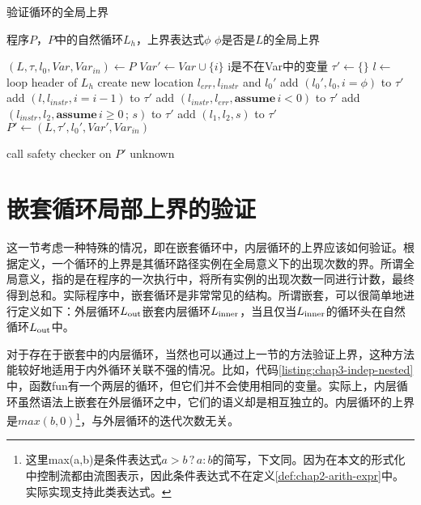 \renewcommand{\algorithmicrequire}{\textbf{输入：}\unskip}
\renewcommand{\algorithmicensure}{\textbf{输出：}\unskip}
\renewcommand{\algorithmiccomment}[1]{\hfill// #1}
\begin{algorithm}
  \caption{验证循环的全局上界}
  \label{alg:global-verif}
  \begin{algorithmic}
    \REQUIRE 程序$P$，$P$中的自然循环$L_h$，上界表达式$\phi$
    \ENSURE $\phi$是否是$L$的全局上界

    \STATE $(L, \tau, l_0, Var, Var_{in}) \leftarrow P$
    \STATE $Var' \leftarrow Var \cup \{i\}$ \COMMENT i是不在Var中的变量
    \STATE $\tau' \leftarrow \{\}$
    \STATE $l \leftarrow$ loop header of $L_h$
    \STATE create new location $l_{err}, l_{instr}$ and $l_0'$
    \STATE add $(l_0', l_0, i = \phi)$ to $\tau'$
    \STATE add $(l, l_{instr}, i = i - 1)$ to $\tau'$
    \STATE add $(l_{instr}, l_{err}, \mathbf{assume}\, i < 0)$ to $\tau'$
        \STATE add $(l_{instr}, l_2, \mathbf{assume}\, i \geq 0\, \mathbf{;}\, s)$ to $\tau'$
    \ENDFOR
        \STATE add $(l_1, l_2, s)$ to $\tau'$ 
    \ENDFOR
    \STATE $P' \leftarrow (L, \tau', l_0', Var', Var_{in})$
    
    \STATE call safety checker on $P'$ 
        \RETURN \TRUE
        \RETURN \FALSE
        \RETURN unknown
    \ENDIF

  \end{algorithmic}
\end{algorithm}

\section{嵌套循环局部上界的验证}

这一节考虑一种特殊的情况，即在嵌套循环中，内层循环的上界应该如何验证。根据定义，一个循环的上界是其循环路径实例在全局意义下的出现次数的界。所谓全局意义，指的是在程序的一次执行中，将所有实例的出现次数一同进行计数，最终得到总和。实际程序中，嵌套循环是非常常见的结构。所谓嵌套，可以很简单地进行定义如下：外层循环$L_{\operatorname{out}}$嵌套内层循环$L_{\operatorname{inner}}$，当且仅当$L_{\operatorname{inner}}$的循环头在自然循环$L_{\operatorname{out}}$中。

对于存在于嵌套中的内层循环，当然也可以通过上一节的方法验证上界，这种方法能较好地适用于内外循环关联不强的情况。比如，代码\ref{listing:chap3-indep-nested}中，函数fun有一个两层的循环，但它们并不会使用相同的变量。实际上，内层循环虽然语法上嵌套在外层循环之中，它们的语义却是相互独立的。内层循环的上界是$max(b, 0)$\footnote{这里max(a,b)是条件表达式$a>b\,?\,a:b$的简写，下文同。因为在本文的形式化中控制流都由流图表示，因此条件表达式不在定义\ref{def:chap2-arith-expr}中。实际实现支持此类表达式。}，与外层循环的迭代次数无关。

